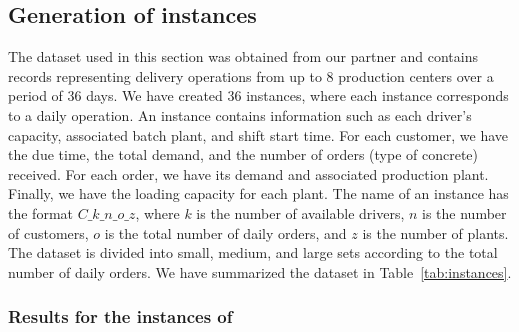 \documentclass{article}
\begin{document}
\subsection{Generation of instances}
\newcommand{\nbInstance}{36}
The dataset used in this section was obtained from our partner and contains records representing delivery operations from up to 8 production centers over a period of $\nbInstance$ days. We have created $\nbInstance$ instances, where each instance corresponds to a daily operation. An instance contains information such as each driver's capacity, associated batch plant, and shift start time. For each customer, we have the due time, the total demand, and the number of orders (type of concrete) received. For each order, we have its demand and associated production plant. Finally, we have the loading capacity for each plant. The name of an instance has the format $C\_k\_n\_o\_z$, where $k$ is the number of available drivers, $n$ is the number of customers, $o$ is the total number of daily orders, and $z$ is the number of plants. The dataset is divided into small, medium, and large sets according to the total number of daily orders. We have summarized the dataset in Table~\ref{tab:instances}.

\begin{table}[htpb]
    \centering
    \caption{Instances summary}
    \label{tab:instances}
    \small
\end{table}

\subsubsection{Results for the instances of \cite{kinable2014concrete}}
\end{document}
